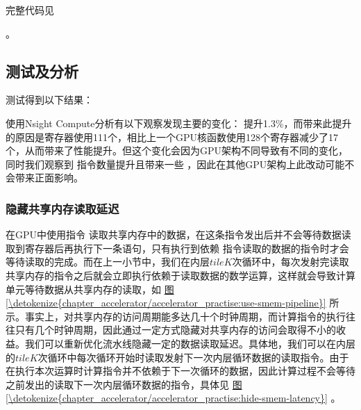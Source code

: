 \documentclass[letterpaper,10pt,english]{sphinxmanual}
\begin{document}
\sphinxAtStartPar
完整代码见%
\begin{footnote}[32]\sphinxAtStartFootnote
{}
%
\end{footnote}。


\subsection{测试及分析}
\label{\detokenize{chapter_accelerator/accelerator_practise:id15}}
\sphinxAtStartPar
测试得到以下结果：

\begin{sphinxVerbatim}[commandchars=\\\{\}]
  
       
\end{sphinxVerbatim}

\sphinxAtStartPar
使用Nsight Compute分析有以下观察发现主要的变化： 
提升1.3\%，而带来此提升的原因是寄存器使用111个，相比上一个GPU核函数使用128个寄存器减少了17个，从而带来了性能提升。但这个变化会因为GPU架构不同导致有不同的变化，同时我们观察到
 指令数量提升且带来一些 
，因此在其他GPU架构上此改动可能不会带来正面影响。


\subsubsection{隐藏共享内存读取延迟}
\label{\detokenize{chapter_accelerator/accelerator_practise:id16}}
\sphinxAtStartPar
在GPU中使用指令 
读取共享内存中的数据，在这条指令发出后并不会等待数据读取到寄存器后再执行下一条语句，只有执行到依赖
指令读取的数据的指令时才会等待读取的完成。而在上一小节中，我们在内层\(tileK\)次循环中，每次发射完读取共享内存的指令之后就会立即执行依赖于读取数据的数学运算，这样就会导致计算单元等待数据从共享内存的读取，如
\hyperref[\detokenize{chapter_accelerator/accelerator_practise:use-smem-pipeline}]{图\ref{\detokenize{chapter_accelerator/accelerator_practise:use-smem-pipeline}}}
所示。事实上，对共享内存的访问周期能多达几十个时钟周期，而计算指令的执行往往只有几个时钟周期，因此通过一定方式隐藏对共享内存的访问会取得不小的收益。我们可以重新优化流水线隐藏一定的数据读取延迟。具体地，我们可以在内层的\(tileK\)次循环中每次循环开始时读取发射下一次内层循环数据的读取指令。由于在执行本次运算时计算指令并不依赖于下一次循环的数据，因此计算过程不会等待之前发出的读取下一次内层循环数据的指令，具体见
\hyperref[\detokenize{chapter_accelerator/accelerator_practise:hide-smem-latency}]{图\ref{\detokenize{chapter_accelerator/accelerator_practise:hide-smem-latency}}} 。
\end{document}
